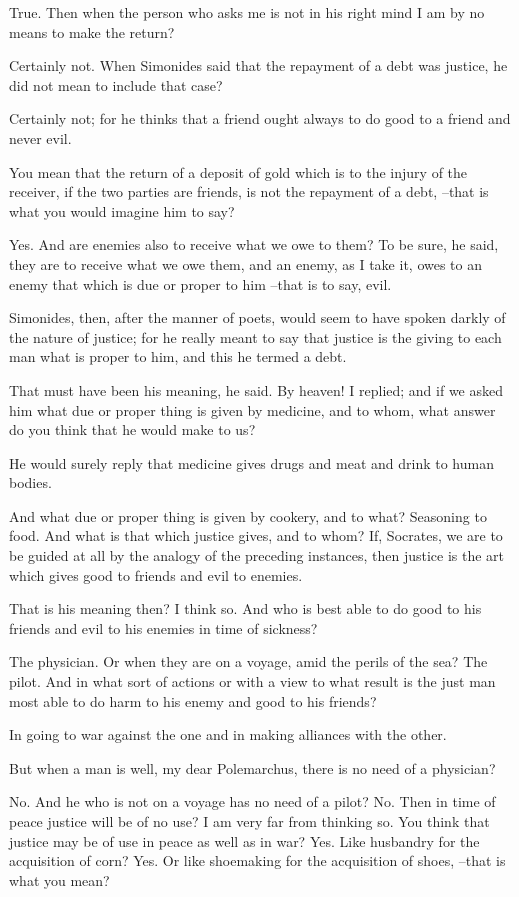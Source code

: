 True.
Then when the person who asks me is not in his right mind I am by no means to make the return?

Certainly not.
When Simonides said that the repayment of a debt was justice, he did not mean to include that case?

Certainly not; for he thinks that a friend ought always to do good to a friend and never evil.

You mean that the return of a deposit of gold which is to the injury of the receiver, if the two parties are friends, is not the repayment of a debt, --that is what you would imagine him to say?

Yes.
And are enemies also to receive what we owe to them?
To be sure, he said, they are to receive what we owe them, and an enemy, as I take it, owes to an enemy that which is due or proper to him --that is to say, evil.

Simonides, then, after the manner of poets, would seem to have spoken darkly of the nature of justice; for he really meant to say that justice is the giving to each man what is proper to him, and this he termed a debt.

That must have been his meaning, he said.
By heaven! I replied; and if we asked him what due or proper thing is given by medicine, and to whom, what answer do you think that he would make to us?

He would surely reply that medicine gives drugs and meat and drink to human bodies.

And what due or proper thing is given by cookery, and to what?
Seasoning to food.
And what is that which justice gives, and to whom?
If, Socrates, we are to be guided at all by the analogy of the preceding instances, then justice is the art which gives good to friends and evil to enemies.

That is his meaning then?
I think so.
And who is best able to do good to his friends and evil to his enemies in time of sickness?

The physician.
Or when they are on a voyage, amid the perils of the sea?
The pilot.
And in what sort of actions or with a view to what result is the just man most able to do harm to his enemy and good to his friends?

In going to war against the one and in making alliances with the other.

But when a man is well, my dear Polemarchus, there is no need of a physician?

No.
And he who is not on a voyage has no need of a pilot?
No.
Then in time of peace justice will be of no use?
I am very far from thinking so.
You think that justice may be of use in peace as well as in war?
Yes.
Like husbandry for the acquisition of corn?
Yes.
Or like shoemaking for the acquisition of shoes, --that is what you mean?

